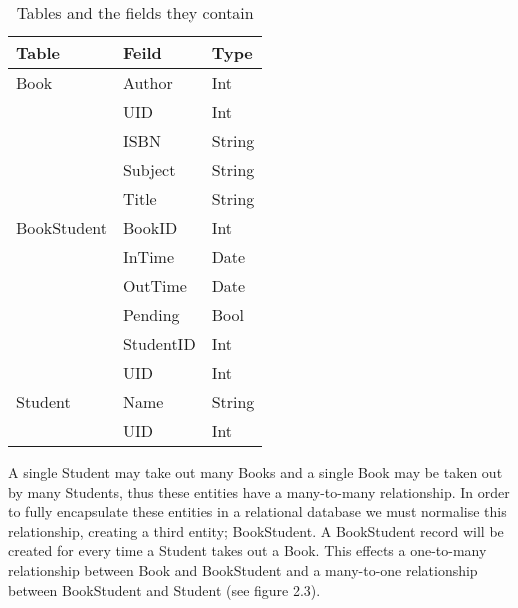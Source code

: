 \documentclass[draft]{book}
\begin{document}
\begin{table}[h]

    \centering

    \begin{tabu} to 0.7\linewidth {lXX}

        \toprule

        Table       & Feild     & Type   \\

        \midrule

        Book        & Author    & Int    \\
                    & UID       & Int    \\
                    & ISBN      & String \\
                    & Subject   & String \\
                    & Title     & String \\
        
        BookStudent & BookID    & Int    \\
                    & InTime    & Date   \\
                    & OutTime   & Date   \\
                    & Pending   & Bool   \\
                    & StudentID & Int    \\
                    & UID       & Int    \\
        Student     & Name      & String \\
                    & UID       & Int    \\
        
        \bottomrule

    \end{tabu}

    \caption[Data Dictionary]{Tables and the fields they contain}

\end{table}

A single Student may take out many Books and a single Book may be taken out by
many Students, thus these entities have a many-to-many relationship. In order to
fully encapsulate these entities in a relational database we must normalise this
relationship, creating a third entity; BookStudent. A BookStudent record will be
created for every time a Student takes out a Book. This effects a one-to-many
relationship between Book and BookStudent and a many-to-one relationship between
BookStudent and Student (see figure 2.3).
\end{document}
